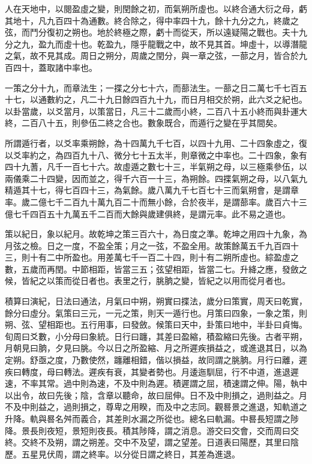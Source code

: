 \begin{pinyinscope}
 人在天地中，以閱盈虛之變，則閏餘之初，而氣朔所虛也。以終合通大衍之母，虧其地十，凡九百四十為通數。終合除之，得中率四十九，餘十九分之九，終歲之弦，而鬥分復初之朔也。地於終極之際，虧十而從天，所以遠疑陽之戰也。夫十九分之九，盈九而虛十也。乾盈九，隱乎龍戰之中，故不見其首。坤虛十，以導潛龍之氣，故不見其成。周日之朔分，周歲之閏分，與一章之弦，一蔀之月，皆合於九百四十，蓋取諸中率也。



 一策之分十九，而章法生；一揲之分七十六，而蔀法生。一蔀之日二萬七千七百五十七，以通數約之，凡二十九日餘四百九十九，而日月相交於朔，此六爻之紀也。以卦當歲，以爻當月，以策當日，凡三十二歲而小終，二百八十五小終而與卦運大終，二百八十五，則參伍二終之合也。數象既合，而遁行之變在乎其間矣。



 所謂遁行者，以爻率乘朔餘，為十四萬九千七百，以四十九用、二十四象虛之，復以爻率約之，為四百九十八、微分七十五太半，則章微之中率也。二十四象，象有四十九蓍，凡千一百七十六。故虛遁之數七十三，半氣朔之母，以三極乘參伍，以兩儀乘二十四變，因而並之，得千六百一十三，為朔餘。四揲氣朔之母，以八氣九精遁其十七，得七百四十三，為氣餘。歲八萬九千七百七十三而氣朔會，是謂章率。歲二億七千二百九十萬九百二十而無小餘，合於夜半，是謂蔀率。歲百六十三億七千四百五十九萬五千二百而大餘與歲建俱終，是謂元率。此不易之道也。



 策以紀日，象以紀月。故乾坤之策三百六十，為日度之準。乾坤之用四十九象，為月弦之檢。日之一度，不盈全策；月之一弦，不盈全用。故策餘萬五千九百四十三，則十有二中所盈也。用差萬七千一百二十四，則十有二朔所虛也。綜盈虛之數，五歲而再閏。中節相距，皆當三五；弦望相距，皆當二七。升絳之應，發斂之候，皆紀之以策而從日者也。表里之行，朓朒之變，皆紀之以用而從月者也。



 積算曰演紀，日法曰通法，月氣曰中朔，朔實曰揲法，歲分曰策實，周天曰乾實，餘分曰虛分。氣策曰三元，一元之策，則天一遁行也。月策曰四象，一象之策，則朔、弦、望相距也。五行用事，曰發斂。候策曰天中，卦策曰地中，半卦曰貞悔。旬周曰爻數，小分母曰象統。日行曰躔，其差曰盈縮，積盈縮曰先後。古者平朔，月朝見曰朒，夕見曰朓。今以日之所盈縮、月之所遲疾損益之，或進退其日，以為定朔。舒亟之度，乃數使然，躔離相錯，偕以損益，故同謂之朓朒。月行曰離，遲疾曰轉度，母曰轉法。遲疾有衰，其變者勢也。月逶迤馴屈，行不中道，進退遲速，不率其常。過中則為速，不及中則為遲。積遲謂之屈，積速謂之伸。陽，執中以出令，故曰先後；陰，含章以聽命，故曰屈伸。日不及中則損之，過則益之。月不及中則益之，過則損之，尊卑之用睽，而及中之志同。觀晷景之進退，知軌道之升降。軌與晷名舛而義合，其差則水漏之所從也。總名曰軌漏。中晷長短謂之陟降。景長則夜短，景短則夜長。積其陟降，謂之消息。游交曰交會，交而周曰交終。交終不及朔，謂之朔差。交中不及望，謂之望差。日道表曰陽歷，其里曰陰歷。五星見伏周，謂之終率。以分從日謂之終日，其差為進退。




\end{pinyinscope}
